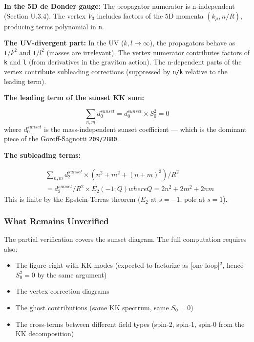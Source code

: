 \documentclass[aps,prd,preprint,superscriptaddress,longbibliography,floatfix]{revtex4-2}
\theoremstyle{remark}
\begin{document}
\textbf{In the 5D de Donder gauge:} The propagator numerator is n-independent (Section U.3.4). The vertex $V_{3}$ includes factors of the 5D momenta $(k_\mu, n/R)$, producing terms polynomial in \texttt{n}.

\textbf{The UV-divergent part:} In the UV ($k, l \to \infty$), the propagators behave as $1/k^{2}$ and $1/l^{2}$ (masses are irrelevant). The vertex numerator contributes factors of \texttt{k} and \texttt{l} (from derivatives in the graviton action). The n-dependent parts of the vertex contribute subleading corrections (suppressed by \texttt{n/k} relative to the leading term).

\textbf{The leading term of the sunset KK sum:}


\begin{equation}
    \sum_{n,m} d_{0}^{sunset} = d_{0}^{sunset} \times S_{0}^{2} = 0
\end{equation}
where $d_{0}^{sunset}$ is the mass-independent sunset coefficient --- which is the dominant piece of the Goroff-Sagnotti \texttt{209/2880}.

\textbf{The subleading terms:}


\begin{align}
    & \sum_{n,m} d_{2}^{sunset} \times (n^{2} + m^{2} + (n+m)^{2})/R^{2} \\
    & = d_{2}^{sunset}/R^{2} \times E_{2}(-1; Q) where Q = 2n^{2} + 2m^{2} + 2nm
\end{align}
This is finite by the Epstein-Terras theorem ($E_{2}$ at $s = -1$, pole at $s = 1$).


\subsubsection{What Remains Unverified}

The partial verification covers the sunset diagram. The full computation requires also:

\begin{itemize}
  \item The figure-eight with KK modes (expected to factorize as [one-loop]$^{2}$, hence $S_{0}^{2} = 0$ by the same argument)
  \item The vertex correction diagrams
  \item The ghost contributions (same KK spectrum, same $S_{0} = 0$)
  \item The cross-terms between different field types (spin-2, spin-1, spin-0 from the KK decomposition)
\end{itemize}
\end{document}
